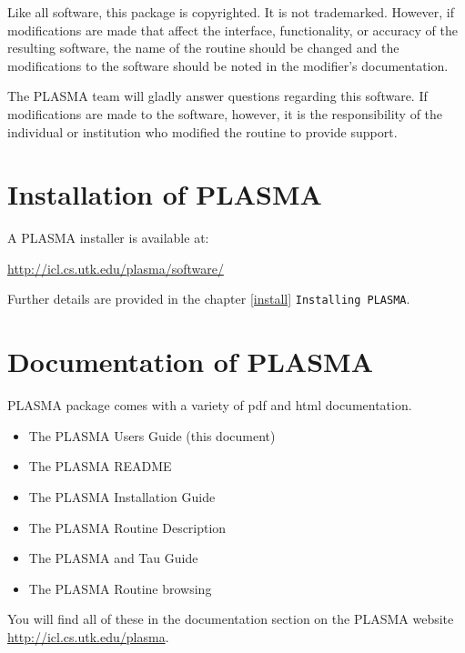 Like all software, this package is copyrighted. It is not trademarked.
However, if modifications are made that affect the interface,
functionality, or accuracy of the resulting software, the name of the
routine should be changed and the modifications to the software should
be noted in the modifier's documentation.

The PLASMA team will gladly answer questions regarding this software.
If modifications are made to the software, however, it is the responsibility of the individual or
institution who modified the routine to provide support.


\section{Installation of PLASMA}

A PLASMA installer is available at:
\begin{link_url}
\url{http://icl.cs.utk.edu/plasma/software/}
\end{link_url}
Further details are provided in the  chapter \ref{install} \texttt{Installing PLASMA}.


\section{Documentation of PLASMA}

PLASMA package comes with a variety of pdf and html documentation.
\begin{itemize}
	\item The PLASMA Users Guide (this document)
	\item The PLASMA README
	\item The PLASMA Installation Guide
	\item The PLASMA Routine Description
	\item The PLASMA and Tau Guide
	\item The PLASMA Routine browsing
\end{itemize}
You will find all of these in the documentation section on the PLASMA website \url{http://icl.cs.utk.edu/plasma}.



